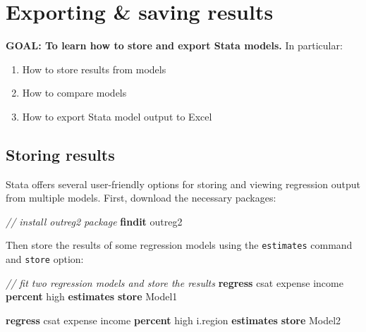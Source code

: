 \documentclass[
]{book}
\newenvironment{Shaded}{\begin{snugshade}}{\end{snugshade}}
\newcommand{\CommentTok}[1]{\textcolor[rgb]{0.56,0.35,0.01}{\textit{#1}}}
\newcommand{\KeywordTok}[1]{\textcolor[rgb]{0.13,0.29,0.53}{\textbf{#1}}}
\newcommand{\NormalTok}[1]{#1}
\providecommand{\tightlist}{%
  \setlength{\itemsep}{0pt}\setlength{\parskip}{0pt}}
\begin{document}
\hypertarget{exporting-saving-results}{%
\section{Exporting \& saving results}\label{exporting-saving-results}}

\begin{alert}

\textbf{GOAL: To learn how to store and export Stata models.} In particular:

\begin{enumerate}
\def\labelenumi{\arabic{enumi}.}
\tightlist
\item
  How to store results from models
\item
  How to compare models
\item
  How to export Stata model output to Excel
\end{enumerate}

\end{alert}

\hypertarget{storing-results}{%
\subsection{Storing results}\label{storing-results}}

Stata offers several user-friendly options for storing and viewing regression output from multiple models. First, download the necessary packages:

\begin{Shaded}
\begin{Highlighting}[]
\CommentTok{// install outreg2 package}
\KeywordTok{findit}\NormalTok{ outreg2}
\end{Highlighting}
\end{Shaded}

Then store the results of some regression models using the \texttt{estimates} command and \texttt{store} option:

\begin{Shaded}
\begin{Highlighting}[]
\CommentTok{// fit two regression models and store the results}
\KeywordTok{regress}\NormalTok{ csat expense income }\KeywordTok{percent}\NormalTok{ high}
\KeywordTok{estimates} \KeywordTok{store}\NormalTok{ Model1}
  
\KeywordTok{regress}\NormalTok{ csat expense income }\KeywordTok{percent}\NormalTok{ high i.region}
\KeywordTok{estimates} \KeywordTok{store}\NormalTok{ Model2}
\end{Highlighting}
\end{Shaded}
\end{document}

